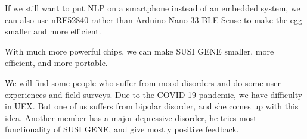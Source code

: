 \documentclass[manuscript,screen]{acmart}
\begin{document}
If we still want to put NLP on a smartphone instead of an embedded system, we can also use nRF52840 rather than Arduino Nano 33 BLE Sense to make the egg smaller and more efficient.

With much more powerful chips, we can make SUSI GENE smaller, more efficient, and more portable. 

We will find some people who suffer from mood disorders and do some user experiences and field surveys. Due to the COVID-19 pandemic, we have difficulty in UEX. But one of us suffers from bipolar disorder, and she comes up with this idea. Another member has a major depressive disorder, he tries most functionality of SUSI GENE, and give mostly positive feedback.



\end{document}

